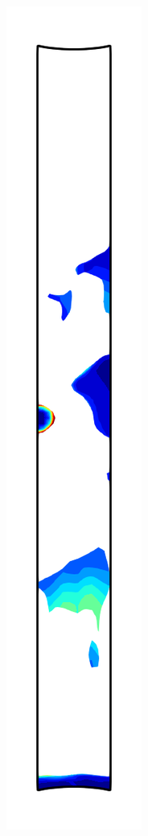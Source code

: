 \begin{figure}[!htb]
\begin{subfigure}{0.08\textwidth}
  \end{subfigure}
  \begin{subfigure}{0.08\textwidth}
    \centering
    \includegraphics[width=\textwidth]{Chapter5/figures/spallation/psii_8}

\end{subfigure}
\end{figure}
